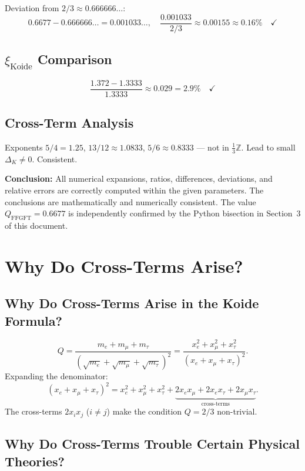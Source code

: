 Deviation from $2/3\approx0.666666\ldots$:
\[
  0.6677-0.666666\ldots=0.001033\ldots, \quad
  \frac{0.001033}{2/3}\approx0.00155\approx0.16\%\quad\checkmark
\]

\subsection{$\xi_{\text{Koide}}$ Comparison}

\[
  \frac{1.372-1.3333}{1.3333}\approx0.029=2.9\%\quad\checkmark
\]

\subsection{Cross-Term Analysis}

Exponents $5/4=1.25$, $13/12\approx1.0833$, $5/6\approx0.8333$
--- not in $\tfrac{1}{3}\mathbb{Z}$. Lead to small $\Delta_K\neq0$. Consistent.

\medskip\noindent
\textbf{Conclusion:} All numerical expansions, ratios, differences, deviations,
and relative errors are correctly computed within the given parameters.
The conclusions are mathematically and numerically consistent.
The value $Q_{\text{FFGFT}}=0.6677$ is independently confirmed by the
Python bisection in Section~3 of this document.

\section{Why Do Cross-Terms Arise?}


\subsection{Why Do Cross-Terms Arise in the Koide Formula?}

\[
  Q = \frac{m_e+m_\mu+m_\tau}{(\sqrt{m_e}+\sqrt{m_\mu}+\sqrt{m_\tau})^2}
  = \frac{x_e^2+x_\mu^2+x_\tau^2}{(x_e+x_\mu+x_\tau)^2}.
\]
Expanding the denominator:
\[
  (x_e+x_\mu+x_\tau)^2 = x_e^2+x_\mu^2+x_\tau^2
  + \underbrace{2x_ex_\mu+2x_ex_\tau+2x_\mu x_\tau}_{\text{cross-terms}}.
\]
The cross-terms $2x_ix_j$ ($i\neq j$) make the condition $Q=2/3$ non-trivial.

\subsection{Why Do Cross-Terms Trouble Certain Physical Theories?}


